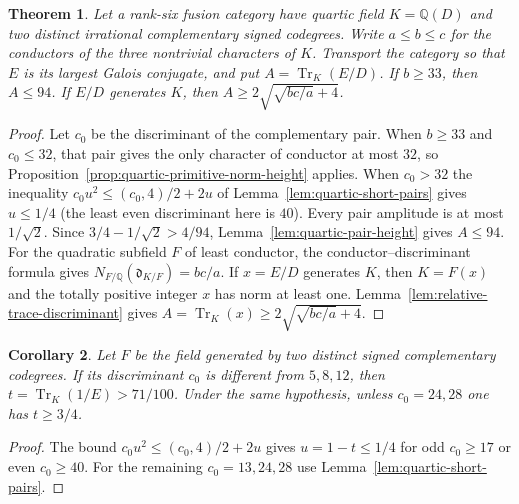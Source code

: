 \documentclass[11pt,reqno]{amsart}
\newtheorem{theorem}{Theorem}[section]
\newtheorem{corollary}[theorem]{Corollary}
\theoremstyle{remark}\newtheorem{remark}[theorem]{Remark}
\numberwithin{equation}{section}
\begin{document}
\begin{theorem}\label{thm:quartic-all-fields}
Let a rank-six fusion category have quartic field $K=\mathbb Q(D)$
and two distinct irrational complementary signed codegrees.
Write $a\le b\le c$ for the conductors of the three nontrivial
characters of $K$. Transport the category so that $E$ is its
largest Galois conjugate, and put $A=\operatorname{Tr}_K(E/D)$.
If $b\ge33$, then $A\le94$. If $E/D$ generates $K$, then
$A\ge 2\sqrt{\sqrt{bc/a}+4}$. 
\end{theorem}
\begin{proof}
Let $c_0$ be the discriminant of the complementary pair. When $b\ge33$
and $c_0\le32$, that pair gives the only character of conductor at
most $32$, so Proposition~\ref{prop:quartic-primitive-norm-height}
applies. When $c_0>32$ the inequality
$c_0u^2\le(c_0,4)/2+2u$ of Lemma~\ref{lem:quartic-short-pairs}
gives $u\le1/4$ (the least even discriminant here is $40$).
Every pair amplitude is at most $1/\sqrt2$. Since
$3/4-1/\sqrt2>4/94$, Lemma~\ref{lem:quartic-pair-height} gives $A\le94$.
For the quadratic subfield $F$ of least conductor, the
conductor--discriminant formula gives
$N_{F/\mathbb Q}(\mathfrak d_{K/F})=bc/a$. If $x=E/D$ generates
$K$, then $K=F(x)$ and the totally positive integer $x$ has norm at
least one. Lemma~\ref{lem:relative-trace-discriminant} gives
$A=\operatorname{Tr}_K(x)\ge2\sqrt{\sqrt{bc/a}+4}$.

\end{proof}

\begin{corollary}\label{cor:quartic-five-unbounded}
Let $F$ be the field generated by two distinct signed complementary
codegrees. If its discriminant $c_0$ is different from $5,8,12$, then
$t=\operatorname{Tr}_K(1/E)>71/100$. Under the same hypothesis, unless $c_0=24,28$ one has
$t\ge3/4$.
\end{corollary}
\begin{proof}
The bound $c_0u^2\le(c_0,4)/2+2u$ gives $u=1-t\le1/4$ for
odd $c_0\ge17$ or even $c_0\ge40$. For the remaining
$c_0=13,24,28$ use Lemma~\ref{lem:quartic-short-pairs}.
\end{proof}
\end{document}
